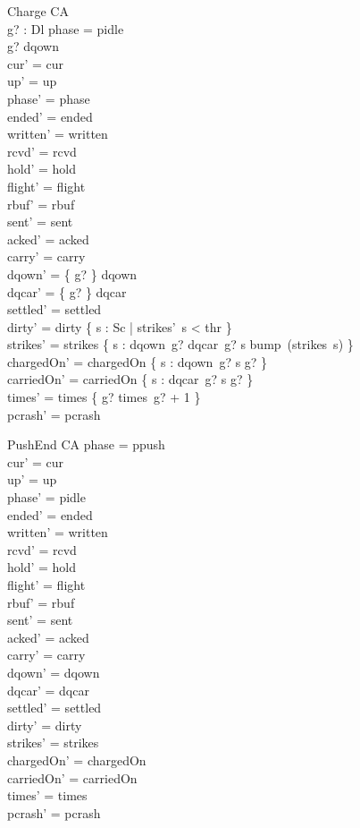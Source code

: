 \documentclass[a4paper,10pt,fleqn]{article}
\begin{document}
\begin{schema}{Charge}
  \Delta CA \\
  g? : Dl
\where
  phase = pidle \\
  g? \in \dom dqown \\
  cur' = cur \\
  up' = up \\
  phase' = phase \\
  ended' = ended \\
  written' = written \\
  rcvd' = rcvd \\
  hold' = hold \\
  flight' = flight \\
  rbuf' = rbuf \\
  sent' = sent \\
  acked' = acked \\
  carry' = carry \\
  dqown' = \{ g? \} \ndres dqown \\
  dqcar' = \{ g? \} \ndres dqcar \\
  settled' = settled \\
  dirty' = dirty \cap \{ s : Sc | strikes'~s < thr \} \\
  strikes' = strikes \oplus \{ s : dqown~g? \cup dqcar~g? \spot s \mapsto bump~(strikes~s) \} \\
  chargedOn' = chargedOn \cup \{ s : dqown~g? \spot s \mapsto g? \} \\
  carriedOn' = carriedOn \cup \{ s : dqcar~g? \spot s \mapsto g? \} \\
  times' = times \oplus \{ g? \mapsto times~g? + 1 \} \\
  pcrash' = pcrash
\end{schema}

\begin{schema}{PushEnd}
  \Delta CA
\where
  phase = ppush \\
  cur' = cur \\
  up' = up \\
  phase' = pidle \\
  ended' = ended \\
  written' = written \\
  rcvd' = rcvd \\
  hold' = hold \\
  flight' = flight \\
  rbuf' = rbuf \\
  sent' = sent \\
  acked' = acked \\
  carry' = carry \\
  dqown' = dqown \\
  dqcar' = dqcar \\
  settled' = settled \\
  dirty' = dirty \\
  strikes' = strikes \\
  chargedOn' = chargedOn \\
  carriedOn' = carriedOn \\
  times' = times \\
  pcrash' = pcrash
\end{schema}
\end{document}
